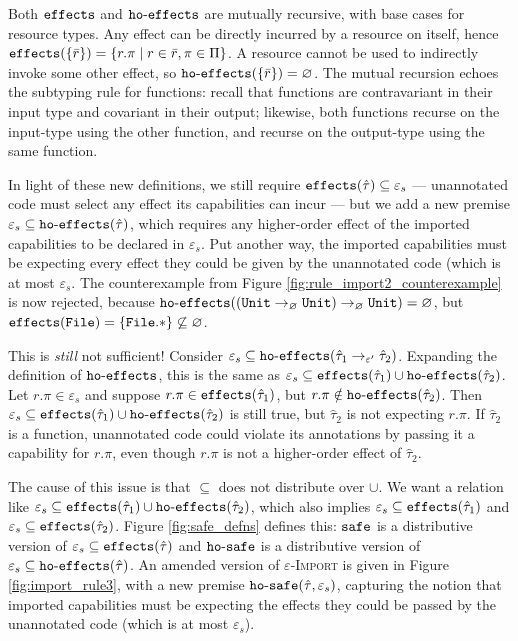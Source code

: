 Both $\mathtt{effects}$ and $\mathtt{ho \hbox{-} effects}$ are mutually recursive,
with base cases for resource types. Any effect can be directly
incurred by a resource on itself, hence
$\mathtt{effects}(\{ \bar r \}) = \{ r.\pi \mid r \in \bar r, \pi \in \Pi \}$. A
resource cannot be used to indirectly invoke some other effect, so
$\mathtt{ho \hbox{-} effects}(\{ \bar r \}) = \varnothing$. The mutual recursion echoes the
subtyping rule for functions: recall that functions are contravariant
in their input type and covariant in their output; likewise, both
functions recurse on the input-type using the other function, and
recurse on the output-type using the same function.

In light of these new definitions, we still require
$\mathtt{effects}(\hat \tau) \subseteq \varepsilon_s$ --- unannotated code must
select any effect its capabilities can incur --- but we add a new
premise $\varepsilon_s \subseteq \mathtt{ho \hbox{-} effects}(\hat \tau)$, which requires
any higher-order effect of the imported capabilities to be declared in
$\varepsilon_s$. Put another way, the imported capabilities must be
expecting every effect they could be given by the unannotated code
(which is at most $\varepsilon_s$. The counterexample from Figure \ref{fig:rule_import2_counterexample} is now rejected, because
$\mathtt{ho \hbox{-} effects}((\mathtt{Unit} \rightarrow_{\varnothing} \mathtt{Unit})
  \rightarrow_{\varnothing} \mathtt{Unit}) = \varnothing$, but
$\mathtt{effects}(\mathtt{File}) = \{ \mathtt{File.*} \} \not\subseteq \varnothing$.

This is
\textit{still} not sufficient! Consider
$\varepsilon_s \subseteq \mathtt{ho \hbox{-} effects}( \hat \tau_1 \rightarrow_{\varepsilon'}
  \hat \tau_2 )$. Expanding the definition of
$\mathtt{ho \hbox{-} effects}$, this is the same as
$\varepsilon_s \subseteq \mathtt{effects}(\hat \tau_1) \cup \mathtt{ho \hbox{-} effects}(\hat
  \tau_2)$. Let $r.\pi \in \varepsilon_s$ and suppose
$r.\pi \in \mathtt{effects}(\hat \tau_1)$, but $r.\pi \notin \mathtt{ho \hbox{-} effects}(\hat
  \tau_2)$. Then
$\varepsilon_s \subseteq \mathtt{effects}(\hat \tau_1) \cup \mathtt{ho \hbox{-} effects}(\hat \tau_2)$ is
still true, but $\hat \tau_2$ is not expecting $r.\pi$. If $\hat \tau_2$ is
a function, unannotated code could violate its annotations by passing it
a capability for $r.\pi$, even though $r.\pi$ is not a higher-order effect
of $\hat \tau_2$.

The cause of this issue is that $\subseteq$
does not distribute over $\cup$. We want a relation like
$\varepsilon_s \subseteq \mathtt{effects}(\hat \tau_1) \cup \mathtt{ho \hbox{-} effects}(\hat \tau_2)$,
which also implies $\varepsilon_s \subseteq \mathtt{effects}(\hat \tau_1)$ and
$\varepsilon_s \subseteq \mathtt{effects}(\hat \tau_2)$. Figure
\ref{fig:safe_defns} defines this: $\mathtt{safe}$ is a distributive
version of $\varepsilon_s \subseteq \mathtt{effects}(\hat \tau)$ and
$\mathtt{ho \hbox{-} safe}$ is a distributive version of
$\varepsilon_s \subseteq \mathtt{ho \hbox{-} effects}(\hat \tau)$. An amended version of
\textsc{$\varepsilon$-Import} is given in Figure \ref{fig:import_rule3},
with a new premise $\mathtt{ho \hbox{-} safe}(\hat \tau, \varepsilon_s)$, capturing the
notion that imported capabilities must be expecting the effects they could
be passed by the unannotated code (which is at most $\varepsilon_s$).


